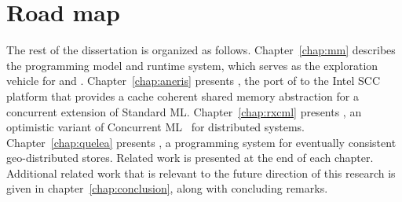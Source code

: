 \section{Road map}

The rest of the dissertation is organized as follows. Chapter~\ref{chap:mm}
describes the \MM programming model and runtime system, which serves as the
exploration vehicle for \MMSCC and \rxcml. Chapter~\ref{chap:aneris} presents
\MMSCC, the port of \MM to the Intel SCC platform that provides a cache
coherent shared memory abstraction for a concurrent extension of Standard ML.
Chapter~\ref{chap:rxcml} presents \rxcml, an optimistic variant of Concurrent
ML~\cite{Reppy99} for distributed systems. Chapter~\ref{chap:quelea} presents
\quelea, a programming system for eventually consistent geo-distributed stores.
Related work is presented at the end of each chapter. Additional related work
that is relevant to the future direction of this research is given in
chapter~\ref{chap:conclusion}, along with concluding remarks.
